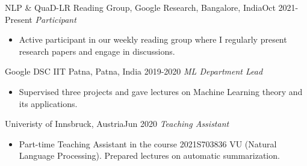 
\begin{projects}

 
\projecta
	{NLP \& QuaD-LR Reading Group, Google Research, Bangalore, India}{Oct 2021-Present}
	{
	    \textit{Participant}
	}
	{\begin{itemize}
     \item Active participant in our weekly reading group where I regularly present research papers and engage in discussions.
     \end{itemize}}

\projecta
	{Google DSC IIT Patna, Patna, India}{ 2019-2020}
	{
	    \textit{ML Department Lead}
	}
	{\begin{itemize}
     \item Supervised three projects and gave lectures on Machine Learning theory and its applications.
     \end{itemize}}

\projecta
	{Univeristy of Innsbruck, Austria}{Jun 2020}
	{
	    \textit{Teaching Assistant}
	}
	{\begin{itemize}
     \item Part-time Teaching Assistant in the course 2021S703836 VU (Natural Language Processing). Prepared lectures on automatic summarization.
     \end{itemize}}
\end{projects}
